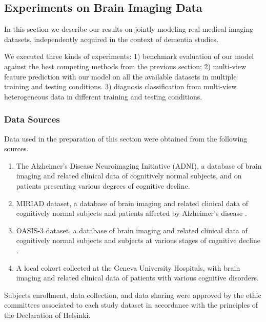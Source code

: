\subsection{Experiments on Brain Imaging Data}
\label{sec:real}

% 
% 
% 

% 
In this section we describe our results on jointly modeling real medical imaging datasets, independently acquired in the context of dementia studies.

We executed three kinds of experiments:
1) benchmark evaluation of our model against the best competing methods from the previous section;
2) multi-view feature prediction with our model on all the available datasets in multiple training and testing conditions.
3) diagnosis classification from multi-view heterogeneous data in different training and testing conditions.

\subsubsection{Data Sources}
\label{ssec:datasets}

Data used in the preparation of this section were obtained from the following sources.
\begin{enumerate}
%
\item The Alzheimer's Disease Neuroimaging Initiative (ADNI),
a database of brain imaging and related clinical data of cognitively normal subjects, and on patients presenting various degrees of cognitive decline.
%
\item MIRIAD dataset, a database of brain imaging and related clinical data of cognitively normal subjects and patients affected by Alzheimer's disease \citep{Miriad}.
%
\item OASIS-3 dataset, a database of brain imaging and related clinical data of cognitively normal subjects and subjects at various stages of cognitive decline \citep{oasis3}.
%
\item A local cohort collected at the Geneva University Hospitals, with brain imaging and related clinical data of patients with various cognitive disorders.
\end{enumerate}
Subjects enrollment, data collection, and data sharing were approved by the ethic committees associated to each study dataset in accordance with the principles of the Declaration of Helsinki.

